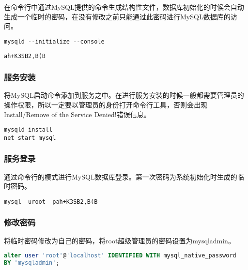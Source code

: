 \documentclass[12pt, openany, oneside]{book}
\begin{document}
在命令行中通过MySQL提供的命令生成结构性文件，数据库初始化的时候会自动生成一个临时的密码，在没有修改之前只能通过此密码进行MySQL数据库的访问。\\


\begin{lstlisting}
mysqld --initialize --console
\end{lstlisting}

\begin{tcolorbox}
	\begin{verbatim}
ah+K3SB2,B(B
	\end{verbatim}
\end{tcolorbox}

\subsubsection{服务安装}

将MySQL启动命令添加到服务之中。在进行服务安装的时候一般都需要管理员的操作权限，所以一定要以管理员的身份打开命令行工具，否则会出现Install/Remove of the Service Denied!错误信息。\\


\begin{lstlisting}
mysqld install
net start mysql
\end{lstlisting}

\subsubsection{服务登录}

通过命令行的模式进行MySQL数据库登录。第一次密码为系统初始化时生成的临时密码。\\


\begin{lstlisting}
mysql -uroot -pah+K3SB2,B(B
\end{lstlisting}

\subsubsection{修改密码}

将临时密码修改为自己的密码，将root超级管理员的密码设置为mysqladmin。\\


\begin{lstlisting}[language=SQL]
alter user 'root'@'localhost' IDENTIFIED WITH mysql_native_password
BY 'mysqladmin';
\end{lstlisting}
\end{document}
